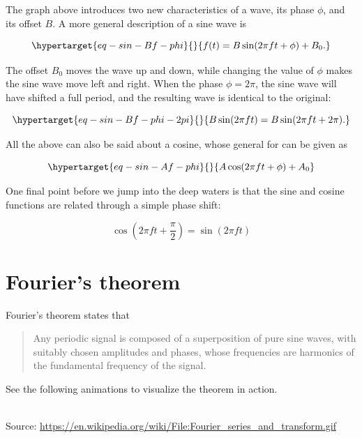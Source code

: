 \documentclass[
  letterpaper,
  DIV=11,
  numbers=noendperiod,
  oneside]{scrreprt}
\begin{document}
The graph above introduces two new characteristics of a wave, its phase
\(\phi\), and its offset \(B\). A more general description of a sine
wave is

\begin{equation}\protect\hypertarget{eq-sin-Bf-phi}{}{
f(t) = B\sin(2\pi f t + \phi) + B_0.
}\label{eq-sin-Bf-phi}\end{equation}

The offset \(B_0\) moves the wave up and down, while changing the value
of \(\phi\) makes the sine wave move left and right. When the phase
\(\phi=2\pi\), the sine wave will have shifted a full period, and the
resulting wave is identical to the original:

\begin{equation}\protect\hypertarget{eq-sin-Bf-phi-2pi}{}{
B\sin(2\pi f t) = B\sin(2\pi f t + 2\pi).
}\label{eq-sin-Bf-phi-2pi}\end{equation}

All the above can also be said about a cosine, whose general for can be
given as

\begin{equation}\protect\hypertarget{eq-sin-Af-phi}{}{
A\cos(2\pi f t + \phi) + A_0
}\label{eq-sin-Af-phi}\end{equation}

One final point before we jump into the deep waters is that the sine and
cosine functions are related through a simple phase shift:

\[
\cos\left(2\pi f t + \frac{\pi}{2}\right) = \sin\left(2\pi f t\right)
\]

\hypertarget{fouriers-theorem}{%
\section{Fourier's theorem}\label{fouriers-theorem}}

Fourier's theorem states that

\begin{quote}
Any periodic signal is composed of a superposition of pure sine waves,
with suitably chosen amplitudes and phases, whose frequencies are
harmonics of the fundamental frequency of the signal.
\end{quote}

See the following animations to visualize the theorem in action.

\strut \\
Source:
\url{https://en.wikipedia.org/wiki/File:Fourier_series_and_transform.gif}
\end{document}

